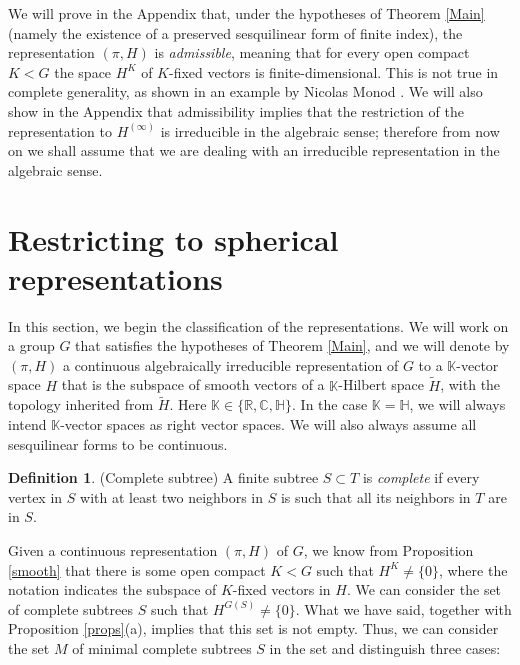 \documentclass{article}
\theoremstyle{definition}
\newtheorem{dfn}{Definition}[section]
\theoremstyle{remark}
\theoremstyle{plain}
\begin{document}
We will prove in the Appendix that, under the hypotheses of Theorem \ref{Main} (namely the existence of a preserved sesquilinear form of finite index), the representation $(\pi,H)$ is \textit{admissible}, meaning that for every open compact $K<G$ the space $H^K$ of $K$-fixed vectors is finite-dimensional. This is not true in complete generality, as shown in an example by Nicolas Monod \cite{inadmissible}. We will also show in the Appendix that admissibility implies that the restriction of the representation to $H^{(\infty)}$ is irreducible in the algebraic sense; therefore from now on we shall assume that we are dealing with an irreducible representation in the algebraic sense. \\

\section{Restricting to spherical representations}

In this section, we begin the classification of the representations. We will work on a group $G$ that satisfies the hypotheses of Theorem \ref{Main}, and we will denote by $(\pi,H)$ a continuous algebraically irreducible representation of $G$ to a $\mathbb{K}$-vector space $H$ that is the subspace of smooth vectors of a $\mathbb{K}$-Hilbert space $\widetilde{H}$, with the topology inherited from $\widetilde{H}$. Here $\mathbb{K}\in\{\mathbb{R},\mathbb{C},\mathbb{H}\}$. In the case $\mathbb{K}=\mathbb{H}$, we will always intend $\mathbb{K}$-vector spaces as right vector spaces. We will also always assume all sesquilinear forms to be continuous. \\

\begin{dfn}{(Complete subtree)}
A finite subtree $S\subset T$ is \textit{complete} if every vertex in $S$ with at least two neighbors in $S$ is such that all its neighbors in $T$ are in $S$. \\
\end{dfn}

Given a continuous representation $(\pi,H)$ of $G$, we know from Proposition \ref{smooth} that there is some open compact $K<G$ such that $H^K\neq\{0\}$, where the notation indicates the subspace of $K$-fixed vectors in $H$. We can consider the set of complete subtrees $S$ such that $H^{G(S)}\neq\{0\}$. What we have said, together with Proposition \ref{props}(a), implies that this set is not empty. Thus, we can consider the set $M$ of minimal complete subtrees $S$ in the set and distinguish three cases:
\end{document}

